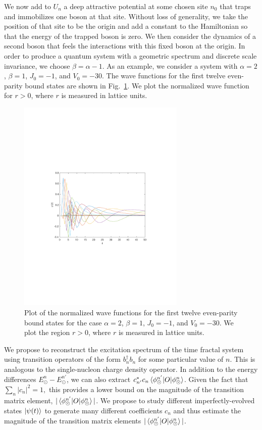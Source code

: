 \documentclass[aps,longbibliography,final,prl,onecolumn,superscriptaddress,nofootinbib,floatfix,11pt]{revtex4-1}
\begin{document}
We now add to $U_n$ a deep attractive potential at some chosen site $n_0$
that traps and immobilizes one boson at that site.  Without loss of generality,
we take the position of that site to be the origin and add a constant to
the Hamiltonian so that the energy of the trapped boson is zero.  We then consider the dynamics
of a second boson that feels the interactions with this fixed boson at the
origin.  In order to produce a quantum system with a geometric spectrum and discrete scale invariance, we choose $\beta=\alpha-1$. As an example, we consider a system with $\alpha = 2$, $\beta = 1$, $J_0 =
-1$, and $V_0
= -30$.  The wave functions for the first twelve even-parity bound states
are shown in Fig.~\ref{even_wavefunctions}. 
We plot
the normalized wave function for $r>0$, where $r$ is measured in lattice
units.
     

\begin{figure}
\centering
\includegraphics[width=8cm]{v30_even_wavefunctions}
\caption{Plot of the normalized wave functions
for the first twelve even-parity bound states for the case $\alpha = 2$,
$\beta =  1$, $J_0 = -1$,
and $V_0 = -30$.  We plot the region $r>0$, where $r$ is measured
in lattice units.}
\label{even_wavefunctions}
\end{figure}
We propose to reconstruct the excitation spectrum of the time fractal system using 
transition operators of the form $b^{\dagger}_n b_n$ for some particular value of $n$.  This is analogous to the single-nucleon charge density operator.  In addition to the  energy differences $E^{n}_\odot-E^{n'}_\odot$, we can also extract $c^*_{n'} c_n \braket{\phi^{n'}_\odot|O|\phi^n_\odot}$.  Given the fact that $\sum_n |c_n|^2=1,$ this provides a lower bound on the magnitude of the transition matrix element,
$|\braket{\phi^{n'}_\odot|O|\phi^n_\odot}|$. We propose to study different
imperfectly-evolved states $\ket{\psi(t)}$ to generate many different coefficients $c_n$ and thus estimate the magnitude of the transition matrix elements $|\braket{\phi^{n'}_\odot|O|\phi^n_\odot}|$.
  
\end{document}
